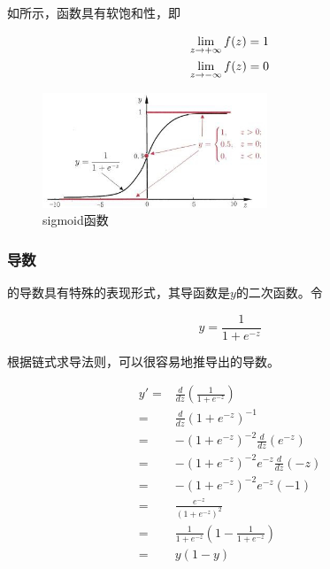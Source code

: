 \begin{content}
如所示，函数具有软饱和性，即

\[\begin{gathered}
  \mathop {\lim }\limits_{z \to  + \infty } f(z) = 1 \hfill \\
  \mathop {\lim }\limits_{z \to  - \infty } f(z) = 0 \hfill \\ 
\end{gathered} \]

\begin{figure}[H]
\centering
\includegraphics[width=0.6\textwidth]{figures/sigmoid.png}
\caption{sigmoid函数}
 \label{fig:sigmoid}
\end{figure}

\subsubsection{导数}

的导数具有特殊的表现形式，其导函数是$y$的二次函数。令

\[
y = \frac{1}{{1 + {e^{ - z}}}}
\]

根据链式求导法则，可以很容易地推导出的导数。

\[\begin{aligned}
  y' =  & \frac{d}{{dz}}\left( {\frac{1}{{1 + {e^{ - z}}}}} \right) \\ 
   =  & \frac{d}{{dz}}{\left( {1 + {e^{ - z}}} \right)^{ - 1}} \\ 
   =  &  - {\left( {1 + {e^{ - z}}} \right)^{ - 2}}\frac{d}{{dz}}\left( {{e^{ - z}}} \right) \\ 
   =  &  - {\left( {1 + {e^{ - z}}} \right)^{ - 2}}{e^{ - z}}\frac{d}{{dz}}\left( { - z} \right) \\ 
   =  &  - {\left( {1 + {e^{ - z}}} \right)^{ - 2}}{e^{ - z}}\left( { - 1} \right) \\ 
   =  & \frac{{{e^{ - z}}}}{{{{\left( {1 + {e^{ - z}}} \right)}^2}}} \\ 
   =  & \frac{1}{{1 + {e^{ - z}}}}\left( {1 - \frac{1}{{1 + {e^{ - z}}}}} \right) \\ 
   =  & y(1 - y) \\ 
\end{aligned} \]


\end{content}
